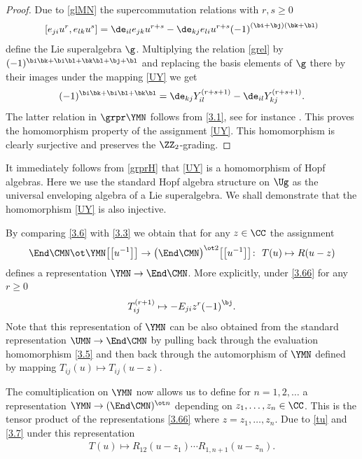\begin{proof}
Due to \eqref{glMN} the supercommutation relations with $r ,s\ge0$
\begin{gather}
\label{grel}
[ e_{ji} u^{r}, e_{lk} u^{s} ]=
\de_{il} e_{jk} u^{r+s}-
\de_{kj} e_{li} u^{r+s}
{(-1)}^{( \bi+ \bj )( \bk+ \bl )}
\end{gather}
define the Lie superalgebra $\g $.
Multiplying the relation \eqref{grel} by
$(-1)^{\bi \bk + \bi \bl + \bk \bl+\bj+\bl}$
and replacing the basis elements of $\g$ there by their images
under the mapping \eqref{UY} we get
\begin{gather*}
[ Y_{ij}^{(r+1)},Y_{kl}^{(s+1)} \bigr]
(-1)^{\bi \bk + \bi \bl + \bk \bl}=
\de_{kj} Y_{il}^{(r+s+1)}-\de_{il} Y_{kj}^{(r+s+1)} .
\end{gather*}
The latter relation in $\grpr\YMN$ follows from \eqref{3.1},
see for instance \cite[Section 1]{MNO}.
This proves the homomorphism property of the assignment \eqref{UY}.
This homomorphism is clearly surjective
and preserves the $\ZZ_{2}$-grading.
\end{proof}

It immediately follows from \eqref{grprH} that
\eqref{UY} is a homomorphism of Hopf algebras.
Here we use the standard Hopf algebra structure on $\Ug$
as the universal enveloping algebra of a Lie superalgebra.
We shall demonstrate that the homomorphism \eqref{UY} is also injective.

By comparing \eqref{3.6} with \eqref{3.3}
we obtain that for any $z\in\CC$ the assignment
\begin{gather}\label{3.66}
\End\CMN\ot\YMN \big[\big[u^{-1}\big]\big]
\to
\big(\End\CMN\big)^{\ot 2} \big[\big[u^{-1}\big]\big]\colon \
T(u)\mapsto R(u-z)
\end{gather}
defines a representation $\YMN\to\End\CMN$. More explicitly, under
\eqref{3.66} for any $r\ge0$
\begin{gather}
\label{2.19}
T_{ij}^{(r+1)}\mapsto
- E_{ji} z^{r} {(-1)}^{\bj} .
\end{gather}
Note that this representation of $\YMN$
can be also obtained from the standard representation $\UMN\to\End\CMN$
by pulling back through the evaluation homomorphism \eqref{3.5}
and then back through the automorphism of $\YMN$ defined by mapping
$
T_{ij}(u)\mapsto T_{ij}(u-z) .
$

The comultiplication on $\YMN$
now allows us to define for $n=1 ,2 , \dots$ a representation
$\YMN\to(\End\CMN)^{\ot n}$ depending on
$z_1,\dots, z_n\in\CC $. This is the tensor product of
the representations \eqref{3.66} where $z=z_1,\dots, z_n $.
Due to \eqref{tu} and \eqref{3.7} under this representation
\begin{gather}\label{3.666}
T(u)\mapsto R_{12}(u-z_1) \cdots R_{1,n+1}(u-z_n) .
\end{gather}

